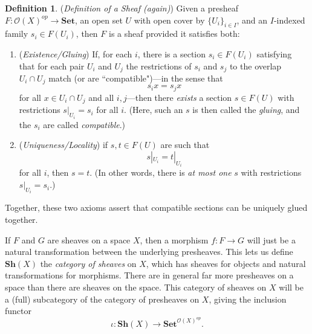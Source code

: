 \documentclass[11pt]{book}
\theoremstyle{definition}
\theoremstyle{definition}
\newtheorem{definition}{Definition}[section]
\theoremstyle{definition}
\theoremstyle{theorem}
\theoremstyle{definition}
\begin{document}
	\begin{definition}
		(\textit{Definition of a Sheaf (again)})
		Given a presheaf $F: \mathscr{O}(X)^{op} \rightarrow \textbf{Set}$, an open set $U$ with open cover by $\{U_i\}_{i \in I}$, and an $I$-indexed family $s_i \in F(U_i)$, then $F$ is a sheaf provided it satisfies both: 
			\begin{enumerate}
				\item (\textit{Existence/Gluing}) If, for each $i$, there is a section $s_i \in F(U_i)$ satisfying that for each pair $U_i$ and $U_j$ the restrictions of $s_i$ and $s_j$ to the overlap $U_i \cap U_j$ match (or are ``compatible")---in the sense that   
				\begin{equation*}
				s_i x = s_j x
				\end{equation*}
				for all $x \in U_i \cap U_j$ and all $i, j$---then there \textit{exists} a section $s \in F(U)$ with restrictions $s |_{U_i} = s_i$ for all $i$. (Here, such an $s$ is then called the \textit{gluing}, and the $s_i$ are called \textit{compatible}.) 
				\item (\textit{Uniqueness/Locality}) if $s, t \in F(U)$ are such that 
				\begin{equation*} 
				s|_{U_i} = t|_{U_i}
				\end{equation*}
				for all $i$, 
				then $s = t$. (In other words, there is \textit{at most one} $s$ with restrictions $s|_{U_i} = s_i$.) 
			\end{enumerate} 
	Together, these two axioms assert that compatible sections can be uniquely glued together. 
	\end{definition} 
\noindent If $F$ and $G$ are sheaves on a space $X$, then a morphism $f: F \rightarrow G$ will just be a natural transformation between the underlying presheaves. This lets us define $\textbf{Sh}(X)$ the \textit{category of sheaves} on $X$, which has sheaves for objects and natural transformations for morphisms. There are in general far more presheaves on a space than there are sheaves on the space. This category of sheaves on $X$ will be a (full) subcategory of the category of presheaves on $X$, giving the inclusion functor 
\begin{equation*}
\iota: \textbf{Sh}(X) \rightarrow \textbf{Set}^{\mathscr{O}(X)^{op}}. 
\end{equation*}
\end{document}
